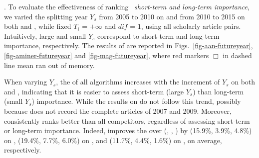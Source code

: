 

.
To evaluate the effectiveness of ranking \wrt\ {\em short-term and long-term importance},
we varied the splitting year $Y_s$ from 2005 to 2010 on \aan and from 2010 to 2015 on both \aminer and \magdata, while fixed $T_i$ = $+\infty$ and $dif$ = $1$, \ie using all scholarly article pairs.
%
Intuitively, large and small $Y_s$ correspond to short-term and long-term importance, respectively.
The results of \PairAcc are reported in Figs.~\ref{fig-aan-futureyear}, \ref{fig-aminer-futureyear} and \ref{fig-mag-futureyear}, where red markers $\Box$ in dashed line mean \hhgrank ran out of memory.


When varying $Y_s$, the \PairAcc of all algorithms increases with the increment of $Y_s$ on both \aminer and \magdata, indicating that it is easier to assess short-term (large $Y_s$) than long-term (small $Y_s$) importance. While the results on \aan do not follow this trend, possibly because \aan does not record the complete articles of 2007 and 2009.
Moreover, \ensemblerank consistently ranks better than all competitors, regardless of assessing short-term or long-term importance.
Indeed, \ensemblerank improves the \PairAcc over (\pagerank, \futurerank, \hhgrank) by (15.9\%, 3.9\%, 4.8\%) on \aan, (19.4\%, 7.7\%, 6.0\%) on \aminer, and  (11.7\%, 4.4\%, 1.6\%) on \magdata, on average, respectively.



